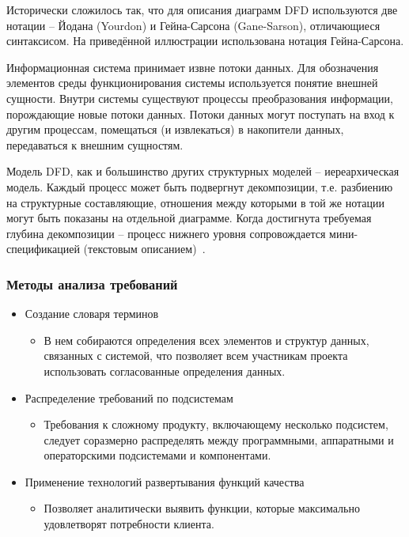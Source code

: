 \documentclass{../industrial-development}
\begin{document}
Исторически сложилось так, что для описания диаграмм DFD используются две
нотации – Йодана (Yourdon) и Гейна-Сарсона (Gane-Sarson), отличающиеся синтаксисом.
На приведённой иллюстрации использована нотация Гейна-Сарсона.

Информационная система принимает извне потоки данных. Для обозначения
элементов среды функционирования системы используется понятие внешней сущности.
Внутри системы существуют процессы преобразования информации, порождающие новые
потоки данных. Потоки данных могут поступать на вход к другим процессам, помещаться
(и извлекаться) в накопители данных, передаваться к внешним сущностям.

Модель DFD, как и большинство других структурных моделей – иереархическая
модель. Каждый процесс может быть подвергнут декомпозиции, т.е. разбиению на
структурные составляющие, отношения между которыми в той же нотации могут быть
показаны на отдельной диаграмме. Когда достигнута требуемая глубина декомпозиции –
процесс нижнего уровня сопровождается мини-спецификацией (текстовым описанием)~\cite[с.~48-49]{Maglinec}.


\begin{frame} \frametitle{Методы анализа требований}
\begin{itemize}
\item  \alert{Создание словаря терминов}
\begin{itemize}
\item  В нем собираются определения всех элементов и структур данных, связанных с системой, что позволяет всем участникам проекта использовать согласованные определения данных.
\end{itemize}
\item \alert{Распределение требований по подсистемам} 
\begin{itemize}
\item Требования к сложному продукту, включающему несколько подсистем, следует соразмерно распределять между программными, аппаратными и операторскими подсистемами и компонентами.
\end{itemize}
\item \alert{Применение технологий развертывания функций качества}
\begin{itemize}
\item Позволяет аналитически выявить функции, которые максимально удовлетворят потребности клиента.
\end{itemize}
\end{itemize}
\end{frame}
\end{document}
